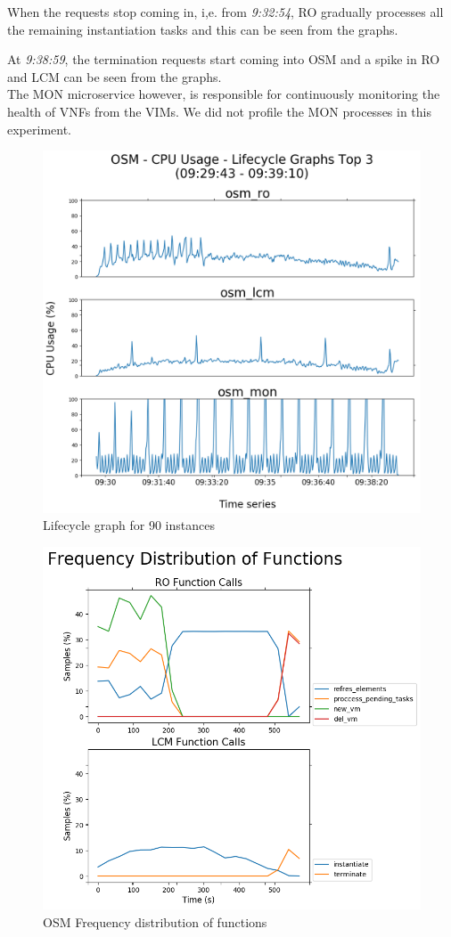When the requests stop coming in, i,e. from \textit{9:32:54}, RO gradually processes all the remaining instantiation tasks and this can be seen from the graphs. 

At \textit{9:38:59}, the termination requests start coming into OSM and a spike in RO and LCM can be seen from the graphs.\\

The MON microservice however, is responsible for continuously monitoring the health of VNFs from the VIMs. We did not profile the MON processes in this experiment.

\begin{figure}[h]
\centering
\includegraphics[width=1\linewidth]{figures/scalability_graphs/Lifecycle-Graphs-Top-3/OSM-TOP-3-Lifecycle-90}
\caption{Lifecycle graph for 90 instances}
\label{fig:osm-top-3-lifecycle-90}
\end{figure}

\begin{figure}[h]
\centering
\includegraphics[width=1\linewidth]{figures/scalability_graphs/Lifecycle-Graphs-Top-3/osm-frequency-dist}
\caption{OSM Frequency distribution of functions}
\label{fig:osm-frequency-dist}
\end{figure}
